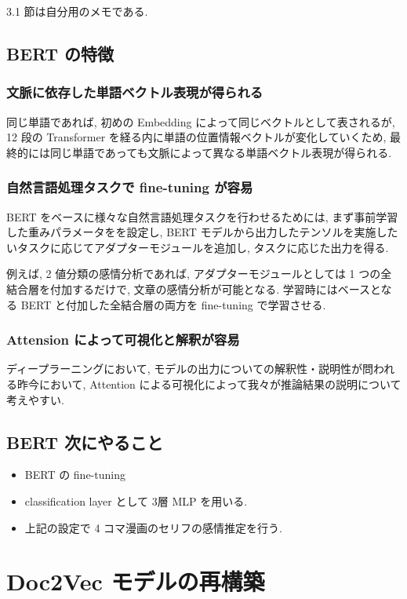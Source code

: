 \documentclass[twocolumn]{jarticle}     %
\begin{document}
3.1 節は自分用のメモである.

\subsection{BERT の特徴}
\subsubsection{文脈に依存した単語ベクトル表現が得られる}
同じ単語であれば, 初めの Embedding によって同じベクトルとして表されるが, 12 段の Transformer を経る内に単語の位置情報ベクトルが変化していくため, 最終的には同じ単語であっても文脈によって異なる単語ベクトル表現が得られる.
\subsubsection{自然言語処理タスクで fine-tuning が容易}
BERT をベースに様々な自然言語処理タスクを行わせるためには, まず事前学習した重みパラメータをを設定し, BERT モデルから出力したテンソルを実施したいタスクに応じてアダプターモジュールを追加し, タスクに応じた出力を得る.

例えば, 2 値分類の感情分析であれば, アダプターモジュールとしては 1 つの全結合層を付加するだけで, 文章の感情分析が可能となる. 学習時にはベースとなる BERT と付加した全結合層の両方を fine-tuning で学習させる.
\subsubsection{Attension によって可視化と解釈が容易}
ディープラーニングにおいて, モデルの出力についての解釈性・説明性が問われる昨今において, Attention による可視化によって我々が推論結果の説明について考えやすい.

\subsection{BERT 次にやること}
\begin{itemize}
  \item BERT の fine-tuning
  \item classification layer として 3層 MLP を用いる.
  \item 上記の設定で 4 コマ漫画のセリフの感情推定を行う.
\end{itemize}


\section{Doc2Vec モデルの再構築}
\end{document}
